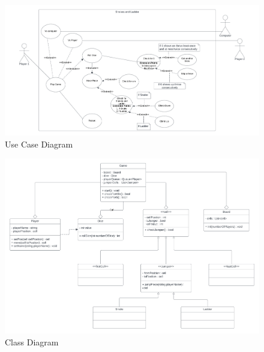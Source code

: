 \documentclass{article}
\begin{document}
\begin{figure}[H]
    \includegraphics[width = 0.90\linewidth]{Images/Use Case Diagram.png}
    \caption{Use Case Diagram}
\end{figure}

\begin{figure}[H]
    \includegraphics[width = 0.90\linewidth]{Images/Class Diagram.png}
    \caption{Class Diagram}
\end{figure}

\newpage
    
\end{document}
